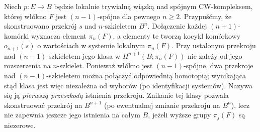 \begin{center}
\end{center}

\begin{twierdzenie}
\label{thm:obstruction-section-v6}
Niech $p:E\to B$ będzie lokalnie trywialną wiązką nad
spójnym CW-kompleksem, której włókno $F$ jest
$(n-1)$-spójne dla pewnego $n\ge2$.
Przypuśćmy, że skonstruowano przekrój $s$ nad
$n$-szkieletem $B^n$. Dołączenie każdej $(n+1)$-komórki
wyznacza element $\pi_n(F)$, a elementy te tworzą
kocykl komórkowy $o_{n+1}(s)$ o wartościach
w systemie lokalnym $\mathcal\pi_n(F)$.
Przy ustalonym przekroju nad $(n-1)$-szkieletem
jego klasa w $H^{n+1}(B;\mathcal\pi_n(F))$ nie zależy
od jego rozszerzenia na $n$-szkielet. Ponieważ
włókno jest $(n-1)$-spójne, dwa przekroje nad
$(n-1)$-szkieletem można połączyć odpowiednią
homotopią; wynikająca stąd klasa jest więc
niezależna od wyborów (po identyfikacji systemów).
Nazywa się ją \emph{pierwszą przeszkodą} istnienia przekroju. Znikanie tej klasy pozwala
skonstruować przekrój na $B^{n+1}$ (po ewentualnej
zmianie przekroju na $B^n$), lecz nie zapewnia
jeszcze jego istnienia na całym $B$, jeżeli
wyższe grupy $\pi_j(F)$ są niezerowe.
\end{twierdzenie}

